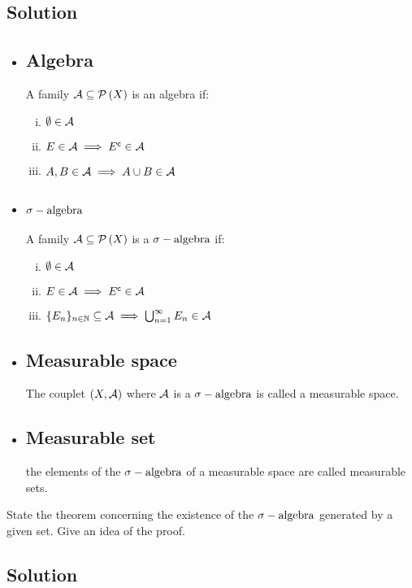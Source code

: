 \subsection*{Solution}
\provdefs
\begin{itemize}
    \item \subsection{Algebra} A family $\mathcal{A}\subseteq\mathcal{P}\left(X\right)$ is an algebra if:
    \begin{enumerate}[i)]
        \item $\emptyset \in \mathcal{A}$
        \item $E\in\mathcal{A} \implies E^{\mathsf{c}} \in\mathcal{A}$
        \item $A,B\in\mathcal{A} \implies A\cup B\in\mathcal{A}$
    \end{enumerate}
    \item \subsection{\texorpdfstring{$\sigma-\text{algebra}$}{Sigma-algebra}} A family $\mathcal{A}\subseteq\mathcal{P}\left(X\right)$ is a $\sigma-\text{algebra}$ if:
    \begin{enumerate}[i)]
        \item $\emptyset \in \mathcal{A}$
        \item $E\in\mathcal{A} \implies E^{\mathsf{c}} \in\mathcal{A}$
        \item $\{ E_n \}_{n\in\mathbb{N}} \subseteq\mathcal{A} \implies \bigcup_{n=1}^\infty E_n \in\mathcal{A}$
    \end{enumerate}
    \item \subsection{Measurable space} The couplet $(X,\mathcal{A})$ where $\mathcal{A}$ is a $\sigma-\text{algebra}$ is called a measurable space.
    \item \subsection{Measurable set} the elements of the $\sigma-\text{algebra}$ of a measurable space are called measurable sets.
\end{itemize}


\question
State the theorem concerning the existence of the $\sigma-\text{algebra}$ generated by a given set. Give an
idea of the proof.

\subsection*{Solution}

